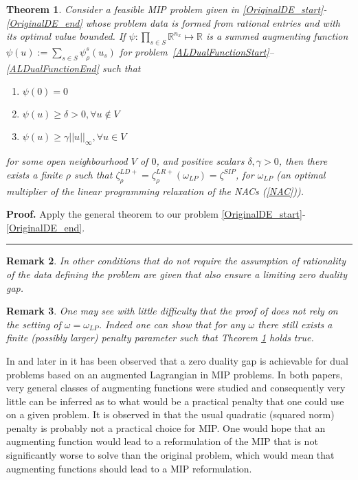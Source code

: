 \documentclass[preprint, 1p, review]{elsarticle}
\newtheorem{theorem}{Theorem}
\newtheorem{remark}[theorem]{Remark}
\newenvironment{proof}[1][Proof]{\noindent\textbf{#1.} }{\ \rule{0.5em}{0.5em}}
\begin{document}
\begin{theorem}\cite[Thm. 5 ]{Feizollahi2016} \label{Thm1}
Consider a feasible MIP problem given in \eqref{OriginalDE_start}-\eqref{OriginalDE_end} whose problem data is formed from rational entries and with its optimal value bounded. 
If $\psi : \prod_{s \in S} \mathbb{R}^{n_x} \mapsto \mathbb{R}$ is a summed augmenting function $\psi(u) := \sum_{s \in S} \psi_\rho^s(u_s)$ for problem~\eqref{ALDualFunctionStart}--\eqref{ALDualFunctionEnd} such that 
\begin{enumerate}
\item $\psi(0) = 0$
\item $\psi(u) \geq \delta > 0, \forall u \not\in V$
\item $\psi(u) \geq \gamma ||u||_\infty, \forall u \in V$
\end{enumerate}
for some open neighbourhood $V$ of $0$, and positive scalars $\delta, \gamma > 0$,
then there exists a finite $\rho$ such that $\zeta^{LD+}_\rho = \zeta^{LR+}_{\rho} (\omega_{LP}) = \zeta^{SIP}$, for $\omega_{LP}$ (an optimal multiplier of the linear programming relaxation of the NACs (\ref{NAC})). 
\end{theorem}

\begin{proof}
Apply the general theorem \cite[Thm. 5 ]{Feizollahi2016} to our problem  \eqref{OriginalDE_start}-\eqref{OriginalDE_end}. 
\end{proof}

\begin{remark}\label{BolandEberhardRem2}
	In \cite{BolandEberhardetal2015}  other conditions that do not require the assumption of rationality of the data defining the problem are given that also ensure a limiting zero duality gap. 
\end{remark}
\begin{remark}\label{BolandEberhard}
One may see with little difficulty that the proof of \cite{Feizollahi2016} does not rely on the setting of $\omega = \omega_{LP}$. Indeed one can show that for any $\omega$ there still exists a finite (possibly larger) penalty parameter such that Theorem \ref{Thm1} holds true. 
\end{remark}

In \cite{BolandEberhardetal2015} and later in \cite{Feizollahi2016} it has been observed that a zero duality gap is achievable for dual problems based on an augmented Lagrangian in MIP problems. In both papers, very general classes of augmenting functions were studied and consequently very little can be inferred as to what would be a practical penalty that one could use on a given problem. It is observed in \cite{Feizollahi2016} that the usual quadratic (squared norm) penalty is probably not a practical choice for MIP. One would hope that an augmenting function would lead to a reformulation of the MIP that is not significantly worse to solve than the original problem, which would mean that augmenting functions should lead to a MIP reformulation. 
\end{document}
